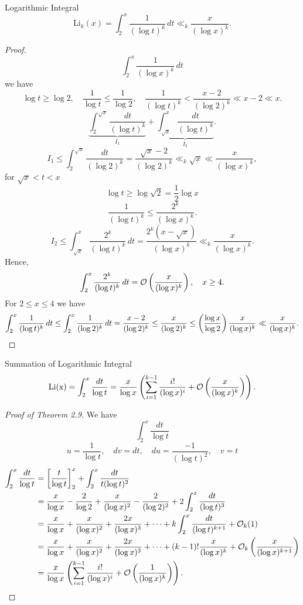 \documentclass[twoside, openright, fontsize=10pt, headings=big]{scrbook}
\begin{document}
\begin{lemma}{Logarithmic Integral}{}
    \[
        \mathrm{Li}_k(x)=\int_{2}^{x}\frac{1}{(\log t)^k}\,dt\ll_k\frac{x}{(\log x)^k}.
    \]
\end{lemma}
\begin{proof}
    \[
        \int_{2}^{x}\frac{1}{(\log x)^k}\,dt
    \]
    we have
    \[
        \log t\geq\log2,\quad \frac{1}{\log t}\leq\frac{1}{\log2},\quad \frac{1}{(\log t)^k}<\frac{x-2}{(\log2)^k}\ll x-2\ll x.
    \]
    \[
        \underbrace{\int_{2}^{\sqrt{x}}\frac{dt}{(\log t)^k}}_{I_1}+\underbrace{\int_{\sqrt{x}}^{x}\frac{dt}{(\log t)^k}}_{I_2}.
    \]
    \[
        I_1\leq\int_{2}^{\sqrt{x}}\frac{dt}{(\log2)^k}=\frac{\sqrt{x}-2}{(\log2)^k}\ll_k\sqrt{x}\ll\frac{x}{(\log x)^k},
    \]
    for $\sqrt{x}< t< x$
    \[
        \log t\geq \log\sqrt{2}=\frac{1}{2}\log x
    \]
    \[
        \frac{1}{(\log t)^k}\leq\frac{2^k}{(\log x)^k}.
    \]
    \[
        I_2\leq \int_{\sqrt{x}}^{x}\frac{2^k}{(\log t)^k}\,dt=\frac{2^k(x-\sqrt{x})}{(\log x)^k}\ll_k\frac{x}{(\log x)^k}.
    \]
    Hence, 
    \[
        \int_{2}^{x}\frac{2^k}{(\log t)^k}\,dt=\mathcal{O}\left(\frac{x}{(\log x)^k}\right),\quad x\geq 4.
    \]
    For $2\leq x\leq 4$ we have
    \[
        \int_{2}^{x}\frac{1}{(\log t)^k}\,dt\leq\int_{2}^{x}\frac{1}{(\log 2)^k}\,dt=\frac{x-2}{(\log 2)^k}\leq\frac{x}{(\log 2)^k}\leq\left(\frac{\log x}{\log2}\right)\frac{x}{(\log x)^k}\ll\frac{x}{(\log x)^k}.\qedhere
    \]
\end{proof}
\begin{theorem}{Summation of Logarithmic Integral}{}
    \[
        \mathrm{Li(x)}=\int_{2}^{x}\frac{dt}{\log t}=\frac{x}{\log x}\left(\sum_{i=1}^{k-1}\frac{i!}{(\log x)^i}+\mathcal{O}\left(\frac{x}{(\log x)^k}\right)\right).
    \]
\end{theorem}
\begin{proof}[Proof of Theorem 2.9]
    We have 
    \[
        \int_{2}^{x}\frac{dt}{\log t}
    \]
    \[
        u=\frac{1}{\log t},\quad dv=dt,\quad du=\frac{-1}{(\log t)^2},\quad v=t
    \]
    \begin{align*}
        \int_{2}^{x}\frac{dt}{\log t}&=\left[\frac{t}{\log t}\right]^x_2+\int_{2}^{x}\frac{dt}{t(\log t)^2}\\
        &=\frac{x}{\log x}-\frac{2}{\log2}+\frac{x}{(\log x)^2}-\frac{2}{(\log 2)^2}+2\int_{2}^{x}\frac{dt}{(\log t)^3}\\
        &=\frac{x}{\log x}+\frac{x}{(\log x)^2}+\frac{2x}{(\log x)^3}+\cdots+k\int_{2}^{x}\frac{dt}{(\log t)^{k+1}}+\mathcal{O}_k(1)\\
        &=\frac{x}{\log x}+\frac{x}{(\log x)^2}+\frac{2x}{(\log x)^3}+\cdots+(k-1)!\frac{x}{(\log x)^k}+\mathcal{O}_k\left(\frac{x}{(\log x)^{k+1}}\right)\\
        &=\frac{x}{\log x}\left(\sum_{i=1}^{k-1}\frac{i!}{(\log x)^i}+\mathcal{O}\left(\frac{1}{(\log x)^k}\right)\right).\qedhere
    \end{align*}
\end{proof}
\end{document}

